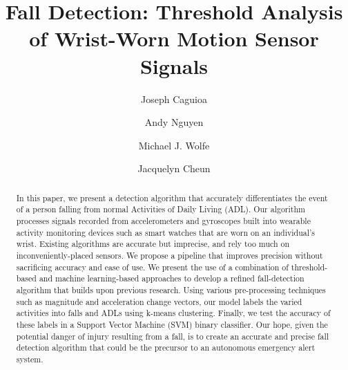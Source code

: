\documentclass{llncs}
\title{\textbf{Fall Detection: Threshold Analysis of Wrist-Worn Motion Sensor Signals}}
\author{Joseph Caguioa\inst{1}\and Andy Nguyen\inst{1}\and  Michael J. Wolfe\inst{1}\and Jacquelyn Cheun\inst{1}} %
\institute{Master of Science in Data Science, Southern Methodist University, Dallas TX 75275 USA
	      \email{\{jcaguioa, andynguyen, mwolfe, \& jcheun\}@smu.edu} 
	      }
\begin{document}
\maketitle

\begin{abstract}
In this paper, we present a detection algorithm that accurately differentiates the event of a person falling from normal Activities of Daily Living (ADL). Our algorithm processes signals recorded from accelerometers and gyroscopes built into wearable activity monitoring devices such as smart watches that are worn on an individual's wrist. Existing algorithms are accurate but imprecise, and rely too much on inconveniently-placed sensors. We propose a pipeline that improves precision without sacrificing accuracy and ease of use. We present the use of a combination of threshold-based and machine learning-based approaches to develop a refined fall-detection algorithm that builds upon previous research. Using various pre-processing techniques such as magnitude and acceleration change vectors, our model labels the varied activities into falls and ADLs using k-means clustering. Finally, we test the accuracy of these labels in a Support Vector Machine (SVM) binary classifier. Our hope, given the potential danger of injury resulting from a fall, is to create an accurate and precise fall detection algorithm that could be the precursor to an autonomous emergency alert system. 
\end{abstract}




\end{document}
